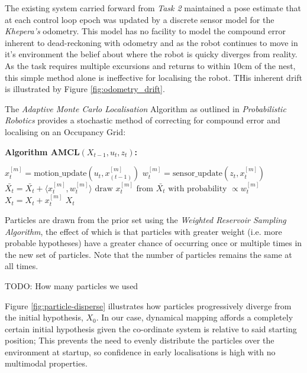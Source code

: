 \documentclass[11pt, a4paper]{article}
\begin{document}
The existing system carried forward from \textit{Task 2}\cite{task2_report} maintained a pose estimate
that at each control loop epoch was updated by a discrete sensor model for the \textit{Khepera's} 
odometry. This model has no facility to model the compound error inherent to dead-reckoning with
odometry and as the robot continues to move in it's environment the belief about where the robot is quicky 
diverges from reality. As the task requires multiple excursions and returns to within 10cm of the nest,
this simple method alone is ineffective for localising the robot. THis inherent drift is illustrated by
Figure \ref{fig:odometry_drift}.

The \textit{Adaptive Monte Carlo Localisation} Algorithm as outlined in 
\textit{Probabilistic Robotics}\cite{probabilisticrobot} provides a stochastic method of correcting
for compound error and localising on an Occupancy Grid:

  \textbf{\large Algorithm AMCL${(X_{t-1}, u_t, z_t)}$:}
  \begin{algorithmic}
    \STATE $x_{t}^{[m]}= \textrm{motion\_update}(u_{t},x_{(t-1)}^{[m]})$
    \STATE $w_{t}^{[m]}= \textrm{sensor\_update}(z_{t},x_{t}^{[m]})$
    \STATE $\bar{X_{t}}=\bar{X_{t}}+\langle x_{t}^{[m]},w_{t}^{[m]}\rangle $
    \ENDFOR
    \STATE $\textrm{draw } x_{t}^{[m]} \textrm{ from } \bar{X_{t}} \textrm{ with probability } \propto w_{t}^{[m]}$
    \STATE $X_{t}=X_{t}+x_{t}^{[m]}$
    \ENDFOR
    \RETURN $X_{t}$
  \end{algorithmic}

Particles are drawn from the prior set using the \textit{Weighted Reservoir Sampling Algorithm},
the effect of which is that particles with greater weight (i.e. more probable hypotheses)
have a greater chance of occurring once or multiple times in the new set of particles. Note that
the number of particles remains the same at all times.

TODO: How many particles we used

Figure \ref{fig:particle-disperse} illustrates how particles progressively diverge from the initial 
hypothesis, ${X_0}$. In our case, dynamical mapping affords a completely certain initial hypothesis
given the co-ordinate system is relative to said starting position; This prevents the need to
evenly distribute the particles over the environment at startup, so confidence in early localisations
is high with no multimodal properties.
\end{document}
